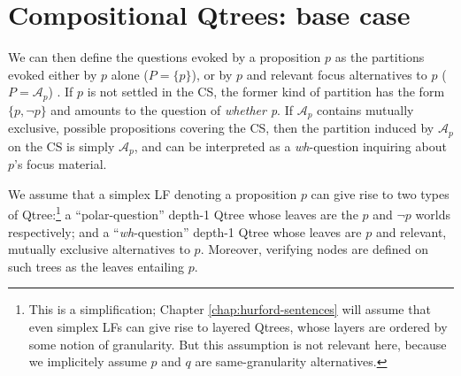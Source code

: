 \begin{exe}
	\label{ex2:qtree-reduction}
\end{exe}




\section{Compositional Qtrees: base case}\label{sec:simplex}




We can then define the questions evoked by a proposition $p$ as the partitions evoked either by $p$ alone ($P=\lbrace p \rbrace$), or by $p$ and relevant focus alternatives to $p$ ($P=\mathcal{A}_p$) \citep{Rooth1992}. If $p$ is not settled in the CS, the former kind of partition has the form $\lbrace p, \neg p\rbrace$ and amounts to the question of \textit{whether p}. If $\mathcal{A}_p$ contains mutually exclusive, possible propositions covering the CS, then the partition induced by $\mathcal{A}_p$ on the CS is simply $\mathcal{A}_p$, and can be interpreted as a \textit{wh}-question inquiring about $p$'s focus material.


We assume that a simplex LF denoting a proposition $p$ can give rise to two types of Qtree:\footnote{This is a simplification; Chapter \ref{chap:hurford-sentences} will assume that even simplex LFs can give rise to layered Qtrees, whose layers are ordered by some notion of granularity. But this assumption is not relevant here, because we implicitely assume $p$ and $q$ are same-granularity alternatives.} a ``polar-question'' depth-1 Qtree whose leaves are the $p$ and $\neg p$ worlds respectively; and a ``\textit{wh}-question'' depth-1 Qtree whose leaves are $p$ and relevant, mutually exclusive alternatives to $p$. Moreover, verifying nodes are defined on such trees as the leaves entailing $p$.

